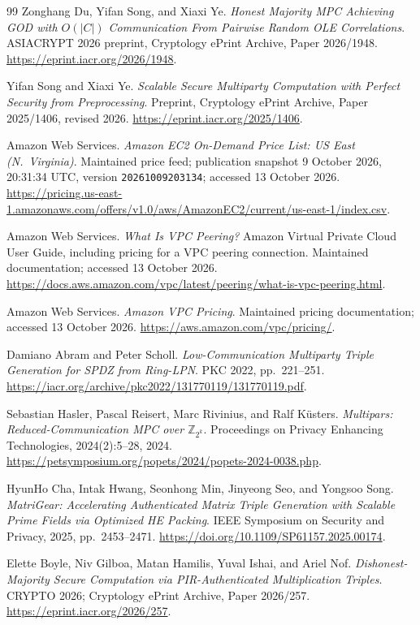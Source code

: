 \documentclass[11pt]{article}
\begin{document}
\begin{thebibliography}{99}
Zonghang Du, Yifan Song, and Xiaxi Ye.
\emph{Honest Majority MPC Achieving GOD with $O(|C|)$ Communication From Pairwise Random OLE Correlations}.
ASIACRYPT 2026 preprint, Cryptology ePrint Archive, Paper 2026/1948.
\url{https://eprint.iacr.org/2026/1948}.

Yifan Song and Xiaxi Ye.
\emph{Scalable Secure Multiparty Computation with Perfect Security from Preprocessing}.
Preprint, Cryptology ePrint Archive, Paper 2025/1406, revised 2026.
\url{https://eprint.iacr.org/2025/1406}.

Amazon Web Services.
\emph{Amazon EC2 On-Demand Price List: US East (N.~Virginia)}.
Maintained price feed; publication snapshot 9 October 2026,
20:31:34 UTC, version \texttt{20261009203134}; accessed 13 October 2026.
\url{https://pricing.us-east-1.amazonaws.com/offers/v1.0/aws/AmazonEC2/current/us-east-1/index.csv}.

Amazon Web Services.
\emph{What Is VPC Peering?}
Amazon Virtual Private Cloud User Guide, including pricing for a VPC peering connection.
Maintained documentation; accessed 13 October 2026.
\url{https://docs.aws.amazon.com/vpc/latest/peering/what-is-vpc-peering.html}.

Amazon Web Services.
\emph{Amazon VPC Pricing}.
Maintained pricing documentation; accessed 13 October 2026.
\url{https://aws.amazon.com/vpc/pricing/}.

Damiano Abram and Peter Scholl.
\emph{Low-Communication Multiparty Triple Generation for SPDZ from Ring-LPN}.
PKC 2022, pp.~221--251.
\url{https://iacr.org/archive/pkc2022/131770119/131770119.pdf}.

Sebastian Hasler, Pascal Reisert, Marc Rivinius, and Ralf K\"usters.
\emph{Multipars: Reduced-Communication MPC over $\mathbb{Z}_{2^k}$}.
Proceedings on Privacy Enhancing Technologies, 2024(2):5--28, 2024.
\url{https://petsymposium.org/popets/2024/popets-2024-0038.php}.

HyunHo Cha, Intak Hwang, Seonhong Min, Jinyeong Seo, and Yongsoo Song.
\emph{MatriGear: Accelerating Authenticated Matrix Triple Generation with Scalable Prime Fields via Optimized HE Packing}.
IEEE Symposium on Security and Privacy, 2025, pp.~2453--2471.
\url{https://doi.org/10.1109/SP61157.2025.00174}.

Elette Boyle, Niv Gilboa, Matan Hamilis, Yuval Ishai, and Ariel Nof.
\emph{Dishonest-Majority Secure Computation via PIR-Authenticated Multiplication Triples}.
CRYPTO 2026; Cryptology ePrint Archive, Paper 2026/257.
\url{https://eprint.iacr.org/2026/257}.


\end{thebibliography}
\end{document}
